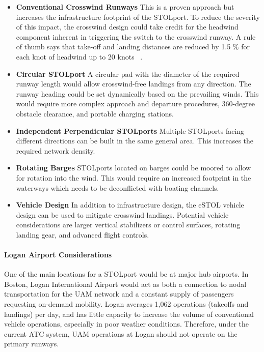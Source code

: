 \documentclass[]{aiaa-tc}%
\begin{document}
\begin{itemize}
\item \textbf{Conventional Crosswind Runways}  This is a proven approach but increases the infrastructure footprint of the STOLport. To reduce the severity of this impact, the crosswind design could take credit for the headwind component inherent in triggering the switch to the crosswind runway. A rule of thumb says that take-off and landing distances are reduced by 1.5 $\%$  for each knot of headwind up to 20 knots ~\cite{Headwind}. 
\item \textbf{Circular STOLport} A circular pad with the diameter of the required runway length would allow crosswind-free landings from any direction.  The runway heading could be set dynamically based on the prevailing winds. This would require more complex approach and departure procedures, 360-degree obstacle clearance, and portable charging stations. 
\item \textbf{Independent Perpendicular STOLports} Multiple STOLports facing different directions can be built in the same general area.  This increases the required network density. 

\item \textbf{Rotating Barges} STOLports located on barges could be moored to allow for rotation into the wind. This would require an increased footprint in the waterways which needs to be deconflicted with boating channels.

\item \textbf{Vehicle Design} In addition to infrastructure design, the eSTOL vehicle design can be used to mitigate crosswind landings. Potential vehicle considerations are larger vertical stabilizers or control surfaces, rotating landing gear, and advanced flight controls.
\end{itemize}
\paragraph{Logan Airport Considerations}
One of the main locations for a STOLport would be at major hub airports. In Boston, Logan International Airport would act as both a connection to nodal transportation for the UAM network and a constant supply of passengers requesting on-demand mobility. Logan averages 1,062 operations (takeoffs and landings) per day\cite{LoganStats}, and has little capacity to increase the volume of conventional vehicle operations, especially in poor weather conditions\cite{LoganOps}. Therefore, under the current ATC system, UAM operations at Logan should not operate on the primary runways.
\end{document}
